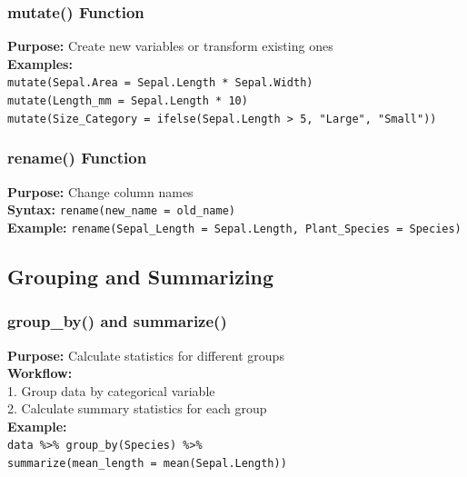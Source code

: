 \documentclass[11pt,a4paper]{article}
\begin{document}
\subsubsection{mutate() Function}

\begin{formulabox}
\textbf{Purpose:} Create new variables or transform existing ones\\[0.3cm]
\textbf{Examples:}\\
\texttt{mutate(Sepal.Area = Sepal.Length * Sepal.Width)}\\
\texttt{mutate(Length\_mm = Sepal.Length * 10)}\\
\texttt{mutate(Size\_Category = ifelse(Sepal.Length > 5, "Large", "Small"))}
\end{formulabox}

\subsubsection{rename() Function}

\begin{formulabox}
\textbf{Purpose:} Change column names\\[0.3cm]
\textbf{Syntax:} \texttt{rename(new\_name = old\_name)}\\[0.3cm]
\textbf{Example:} \texttt{rename(Sepal\_Length = Sepal.Length, Plant\_Species = Species)}
\end{formulabox}

\subsection{Grouping and Summarizing}

\subsubsection{group\_by() and summarize()}

\begin{formulabox}
\textbf{Purpose:} Calculate statistics for different groups\\[0.3cm]
\textbf{Workflow:}\\
1. Group data by categorical variable\\
2. Calculate summary statistics for each group\\[0.3cm]
\textbf{Example:}\\
\texttt{data \%>\% group\_by(Species) \%>\%}\\[0.1cm]
\texttt{summarize(mean\_length = mean(Sepal.Length))}
\end{formulabox}
\end{document}

